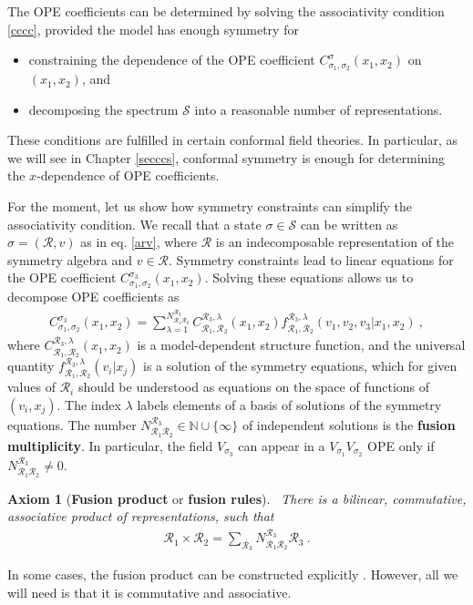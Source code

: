 \documentclass[12pt, a4paper, notitlepage, twoside]{report}
\numberwithin{equation}{section}
\theoremstyle{break}
\newtheorem{hyp}{Axiom}[chapter]
\begin{document}
The OPE coefficients can be determined by solving the associativity condition \eqref{cccc}, provided the model has enough symmetry for 
\begin{itemize}
 \item constraining the dependence of the OPE coefficient $C_{\sigma_1,\sigma_2}^{\sigma}(x_1,x_2)$ on $(x_1,x_2)$, and
\item decomposing the spectrum $\mathcal{S}$ into a reasonable number of representations.
\end{itemize}
These conditions are fulfilled in certain conformal field theories.
In particular, as we will see in Chapter \ref{secccs}, conformal symmetry is enough for determining the $x$-dependence of OPE coefficients. 

For the moment, let us show how symmetry constraints can simplify the associativity condition.
We recall that a state $\sigma\in \mathcal{S}$ can be written as $\sigma=(\mathcal{R},v)$ as in eq. \eqref{arv}, where $\mathcal{R}$ is an indecomposable representation of the symmetry algebra and $v\in \mathcal{R}$.
Symmetry constraints lead to linear equations for the OPE coefficient 
$C_{\sigma_1,\sigma_2}^{\sigma_3}(x_1,x_2)$.
Solving these equations allows us to decompose
OPE coefficients as
\begin{align}
 C_{\sigma_1,\sigma_2}^{\sigma_3}(x_1,x_2) = \sum_{\lambda=1}^{N_{\mathcal{R}_1\mathcal{R}_2}^{\mathcal{R}_3}} C_{\mathcal{R}_1,\mathcal{R}_2}^{\mathcal{R}_3,\lambda}(x_1,x_2) f_{\mathcal{R}_1,\mathcal{R}_2}^{\mathcal{R}_3,\lambda}(v_1,v_2,v_3|x_1,x_2)\ ,
\label{clcf}
\end{align}
where $C_{\mathcal{R}_1,\mathcal{R}_2}^{\mathcal{R}_3,\lambda}(x_1,x_2)$ is a model-dependent structure function, and 
the universal quantity $f_{\mathcal{R}_1,\mathcal{R}_2}^{\mathcal{R}_3,\lambda}(v_i|x_j)$ is a solution of the symmetry equations, which for given values of $\mathcal{R}_i$ should be understood as equations on the space of functions of $(v_i,x_j)$.
The index $\lambda$ labels elements of a basis of solutions of the symmetry equations.
The number $N_{\mathcal{R}_1\mathcal{R}_2}^{\mathcal{R}_3}\in {\mathbb{N}} \cup \{\infty\}$ of independent solutions is the \textbf{\boldmath fusion multiplicity}. 
In particular, the field $V_{\sigma_3}$ can appear in a $V_{\sigma_1}V_{\sigma_2}$ OPE only if $N_{\mathcal{R}_1\mathcal{R}_2}^{\mathcal{R}_3}\neq 0$.

\begin{hyp}[\textbf{\boldmath Fusion product} or \textbf{\boldmath fusion rules}]
 ~\label{ax:fp}
 There is a bilinear, commutative, associative product of representations, such that 
 \begin{align}
 \mathcal{R}_1 \times \mathcal{R}_2  = \sum_{\mathcal{R}_3} N_{\mathcal{R}_1\mathcal{R}_2}^{\mathcal{R}_3} \mathcal{R}_3 \ . 
\label{rrnr}
\end{align}
\end{hyp} 
\noindent
In some cases, the fusion product can be constructed explicitly \cite{gab99}. However, all we will need is that it is commutative and associative. 
\end{document}
